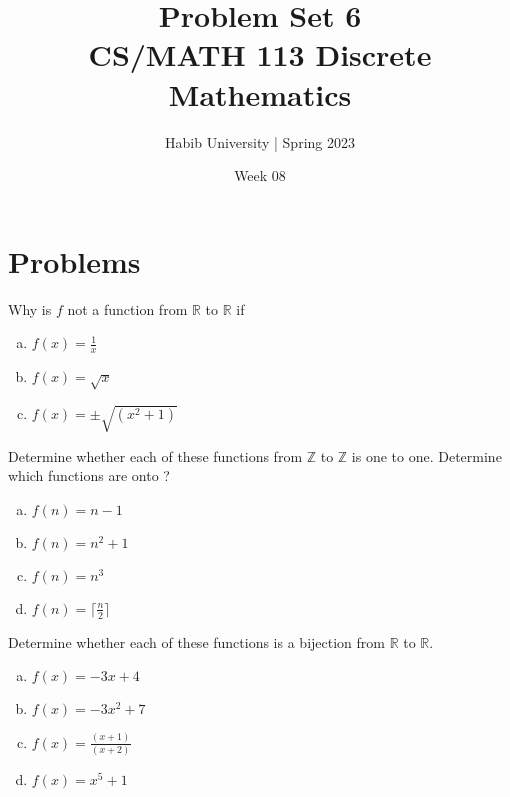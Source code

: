 \documentclass{article}
\newenvironment{problem}[2][Problem]{\begin{trivlist}
\item[\hskip \labelsep {\bfseries #1}\hskip \labelsep {\bfseries #2.}]}{\end{trivlist}}
\begin{document}
\title{Problem Set 6\\CS/MATH 113 Discrete Mathematics}
\author{Habib University | Spring 2023}
\date{Week 08}
\maketitle

\section{Problems}

\begin{problem}{1}[Chapter 2.3, Question 1]
Why is $f$ not a function from $\mathbb{R}$ to $\mathbb{R}$ if 
\begin{enumerate}[(a)]
    \item $ f(x) = \frac{1}{x}$
    \item $ f(x) = \sqrt{x}$
    \item $ f(x) = \pm  \sqrt{(x^2 + 1)}$
    
\end{enumerate}
\end{problem}

\begin{problem}{2}[Chapter 2.3, Question 12, 13]
Determine whether each of these functions from $\mathbb{Z}$ to $\mathbb{Z}$ is one to one. Determine which functions are onto ?
\begin{enumerate}[(a)]
    \item $f(n) = n - 1$
    \item $f(n) = n^2 + 1$
    \item $f(n) = n^3 $
    \item $f(n) = \lceil \frac{n}{2} \rceil $
\end{enumerate}
\end{problem}

\begin{problem}{3}[Chapter 2.3, Question 22]
Determine whether each of these functions is a bijection from $\mathbb{R}$ to $\mathbb{R}$.
    \begin{enumerate}[(a)]
        \item $f(x) = -3x + 4$
        \item $f(x) = -3x^2 + 7$
        \item $f(x) = \frac{(x+1)}{(x+2)} $
        \item $f(x) = x^5 + 1 $
\end{enumerate}
\end{problem}
\end{document}
